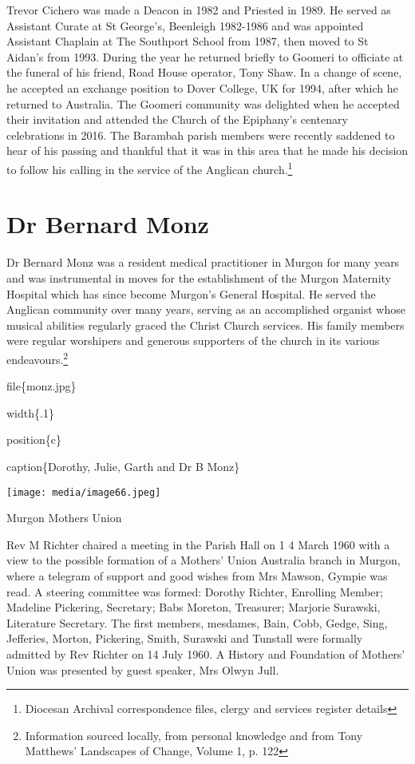 Trevor Cichero was made a Deacon in 1982 and Priested in 1989. He served as Assistant Curate at St George's, Beenleigh 1982-1986 and was appointed Assistant Chaplain at The Southport School from 1987, then moved to St Aidan's from 1993. During the year he returned briefly to Goomeri to officiate at the funeral of his friend, Road House operator, Tony Shaw. In a change of scene, he accepted an exchange position to Dover College, UK for 1994, after which he returned to Australia. The Goomeri community was delighted when he accepted their invitation and attended the Church of the Epiphany's centenary celebrations in 2016. The Barambah parish members were recently saddened to hear of his passing and thankful that it was in this area that he made his decision to follow his calling in the service of the Anglican church.\footnote{Diocesan Archival correspondence files, clergy and services register details}

\hypertarget{dr-bernard-monz}{%
\section{Dr Bernard Monz}\label{dr-bernard-monz}}

Dr Bernard Monz was a resident medical practitioner in Murgon for many years and was instrumental in moves for the establishment of the Murgon Maternity Hospital which has since become Murgon's General Hospital. He served the Anglican community over many years, serving as an accomplished organist whose musical abilities regularly graced the Christ Church services. His family members were regular worshipers and generous supporters of the church in its various endeavours.\footnote{Information sourced locally, from personal knowledge and from Tony Matthews' Landscapes of Change, Volume 1, p. 122}

file\{monz.jpg\}

width\{.1\}

position\{c\}

caption\{Dorothy, Julie, Garth and Dr B Monz\}

\texttt{[image: media/image66.jpeg]}

Murgon Mothers Union

Rev M Richter chaired a meeting in the Parish Hall on 1 4 March 1960 with a view to the possible formation of a Mothers' Union Australia branch in Murgon, where a telegram of support and good wishes from Mrs Mawson, Gympie was read. A steering committee was formed: Dorothy Richter, Enrolling Member; Madeline Pickering, Secretary; Babs Moreton, Treasurer; Marjorie Surawski, Literature Secretary. The first members, mesdames, Bain, Cobb, Gedge, Sing, Jefferies, Morton, Pickering, Smith, Surawski and Tunstall were formally admitted by Rev Richter on 14 July 1960. A History and Foundation of Mothers' Union was presented by guest speaker, Mrs Olwyn Jull.

